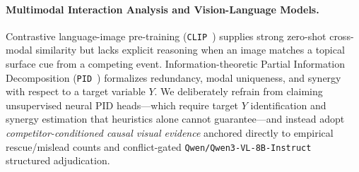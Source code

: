 \paragraph{Multimodal Interaction Analysis and Vision-Language Models.}
Contrastive language-image pre-training (\texttt{CLIP}~\cite{radford2021clip}) supplies strong zero-shot cross-modal similarity but lacks explicit reasoning when an image matches a topical surface cue from a competing event. Information-theoretic Partial Information Decomposition (\texttt{PID}~\cite{liang2023pid}) formalizes redundancy, modal uniqueness, and synergy with respect to a target variable $Y$. We deliberately refrain from claiming unsupervised neural PID heads---which require target $Y$ identification and synergy estimation that heuristics alone cannot guarantee---and instead adopt \emph{competitor-conditioned causal visual evidence} anchored directly to empirical rescue/mislead counts and conflict-gated \texttt{Qwen/Qwen3-VL-8B-Instruct}~\cite{bai2025qwen3vl} structured adjudication.
